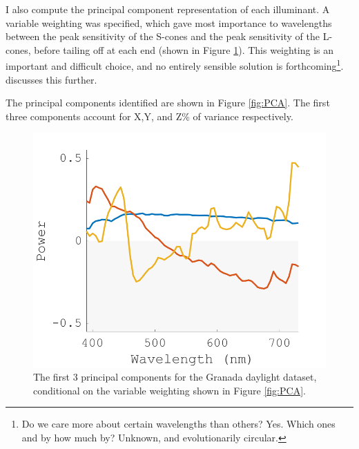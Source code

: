 I also compute the principal component representation of each illuminant. A variable weighting was specified, which gave most importance to wavelengths between the peak sensitivity of the S-cones and the peak sensitivity of the L-cones, before tailing off at each end (shown in Figure \ref{fig:VW}). This weighting is an important and difficult choice, and no entirely sensible solution is forthcoming\footnote{Do we care more about certain wavelengths than others? Yes. Which ones and by how much by? Unknown, and evolutionarily circular.}. \citet{maloney_evaluation_1986} discusses this further. %


The principal components identified are shown in Figure \ref{fig:PCA}. The first three components account for X,Y, and Z\% of variance respectively.

\begin{figure}[htbp]
 \includegraphics[max width=\textwidth]{figs/comp/melcomp_3/8.png}
 \caption{The first 3 principal components for the Granada daylight dataset, conditional on the variable weighting shown in Figure \ref{fig:PCA}.}
 \label{fig:VW}
\end{figure} 

